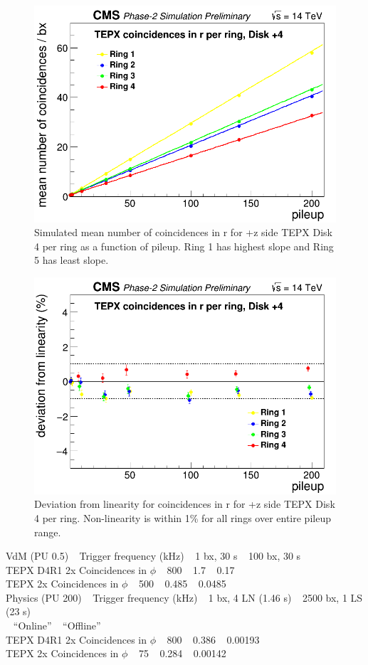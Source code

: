 \begin{figure}[H]
  \centering
  \includegraphics[width=0.5\columnwidth]{./TEPX_coincidences_in_r_per_ring_mean_number_of_coincidences___bxDisk4_Linearity.png}
  \caption{Simulated mean number of coincidences in r for +z side TEPX Disk 4 per ring as a function of pileup. Ring 1 has highest slope and Ring 5 has least slope.}
  \label{fig:CMS}
\end{figure}


\begin{figure}[H]
  \centering
  \includegraphics[width=0.5\columnwidth]{./TEPX_coincidences_in_r_per_ring_mean_number_of_coincidences___bxDisk4_Linearity_residuals.png}
  \caption{Deviation from linearity for coincidences in r for +z side TEPX Disk 4 per ring. Non-linearity is within 1\% for all rings over entire pileup range.}
  \label{fig:CMS}
\end{figure}



VdM (PU 0.5) $\:\:$  Trigger frequency (kHz) $\:\:$ 1 bx, 30 s $\:\:$ 100 bx, 30 s \\
TEPX D4R1 2x Coincidences in $\phi$  $\:\:$  800        $\:\:$   1.7         $\:\:$       0.17   \\
TEPX 2x Coincidences in $\phi$   $\:\:$     500        $\:\:$   0.485       $\:\:$       0.0485   \\




Physics (PU 200)  $\:\:$ Trigger frequency (kHz)   $\:\:$   1 bx, 4 LN (1.46 s)   $\:\:$     2500 bx, 1 LS (23 s)  \\
                                                      $\:\:$           ``Online''          $\:\:$           ``Offline''      \\
TEPX D4R1 2x Coincidences in $\phi$  $\:\:$   800                $\:\:$   0.386           $\:\:$            0.00193         \\
TEPX 2x Coincidences in $\phi$       $\:\:$   75           $\:\:$         0.284           $\:\:$            0.00142         \\

